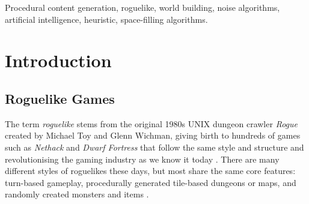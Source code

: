 \documentclass[12pt,a4paper]{article}
\begin{document}
\begin{abstract}
{\bf Conclusion}

The techniques described in this work, although in their infancy, display excellent promise. We show that both the Cellular Automata algorithm and diamond-square algorithm are viable candidates for future roguelikes, and present a new technique for generating cave-like structures that is capable of bridging the gap between traditional, manual methods of content creation with their procedural counterparts. 

[TOO happy/colloquial?]

\end{abstract}



\begin{keywords}
Procedural content generation, roguelike, world building, noise algorithms, artificial intelligence, heuristic, space-filling algorithms.
\end{keywords}

\section{Introduction}


\subsection{Roguelike Games}

The term \emph{roguelike} stems from the original 1980s UNIX dungeon crawler \emph{Rogue} created by Michael Toy and Glenn Wichman, giving birth to hundreds of games such as \emph{Nethack} and \emph{Dwarf Fortress} that follow the same style and structure and revolutionising the gaming industry as we know it today \cite{Dunhack}. There are many different styles of roguelikes these days, but most share the same core features: turn-based gameplay, procedurally generated tile-based dungeons or maps, and randomly created monsters and items \cite{pgcbook}. 
\end{document}

